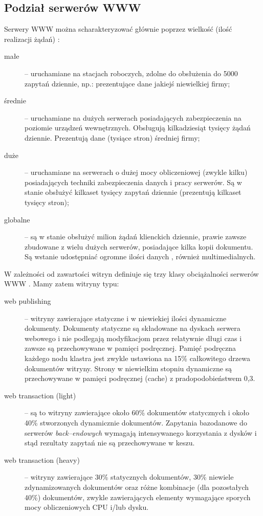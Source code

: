 \subsection{Podział serwerów WWW}

\hspace{0.63cm}Serwery WWW można scharakteryzować głównie poprzez wielkość (ilość realizacji żądań) \cite{wybraneelementy}:
\begin{description}
\item[małe] -- uruchamiane na stacjach roboczych, zdolne do obsłużenia do 5000 zapytań dziennie, np.: prezentujące dane jakiejś
niewielkiej firmy;
\item[średnie] -- uruchamiane na dużych serwerach posiadających zabezpieczenia na poziomie urządzeń wewnętrznych. Obsługują
kilkadziesiąt tysięcy żądań dziennie. Prezentują dane (tysiące stron) średniej firmy;
\item[duże] -- uruchamiane na serwerach o dużej mocy obliczeniowej (zwykle kilku) posiadających techniki zabezpieczenia
danych i pracy serwerów. Są w stanie obsłużyć kilkaset tysięcy zapytań dziennie (prezentują kilkaset tysięcy stron);
\item[globalne] -- są w stanie obsłużyć milion żądań klienckich dziennie, prawie zawsze zbudowane z wielu dużych serwerów, 
posiadające kilka kopii dokumentu. Są wstanie udostępniać ogromne ilości danych , również multimedialnych.
\end{description}
W zależności od zawartości witryn definiuje się trzy klasy obciążalności serwerów WWW \cite{ScalableWebClusters}. Mamy zatem 
witryny typu:
\begin{description}
\item[web publishing] -- witryny zawierające statyczne i w niewiekiej ilości dynamiczne dokumenty. Dokumenty statyczne są 
składowane na dyskach serwera webowego i nie podlegają modyfikacjom przez relatywnie długi czas i zawsze są przechowywane w 
pamięci podręcznej. Pamięć podręczna każdego nodu klastra jest zwykle ustawiona na 15\% całkowitego drzewa dokumentów witryny.
Strony w niewielkim stopniu dynamiczne są przechowywane w pamięci podręcznej (cache) z pradopodobieństwem 0,3.
\item[web transaction (light)] -- są to witryny zawierające około 60\% dokumentów statycznych i około 40\% stworzonych 
dynamicznie dokumentów. Zapytania bazodanowe do serwerów \emph{back--endowych} wymagają intensywanego korzystania z dysków i 
stąd rezultaty zapytań nie są przechowywane w keszu.
\item[web transaction (heavy)] -- witryny zawierające 30\% statycznych dokumentów, 30\% niewiele zdynamizowanych dokumentów
oraz różne kombinacje (dla pozostałych 40\%) dokumentów, zwykle zawierających elementy wymagające sporych mocy obliczeniowych 
CPU i/lub dysku.
\end{description}

